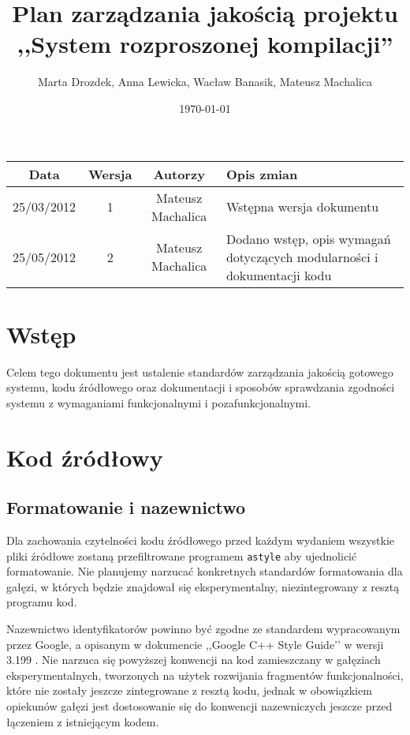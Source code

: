 \documentclass[a4paper]{article}
\title{Plan zarządzania jakością projektu ,,System rozproszonej kompilacji''}
\author{Marta Drozdek, Anna Lewicka, Wacław Banasik, Mateusz Machalica}
\date{\today}
\begin{document}
\maketitle

\begin{table}[!h]
	\centering
	\begin{tabular}{|c|c|c|p{9cm}|}
		\hline
		\textbf{Data} & \textbf{Wersja} & \textbf{Autorzy} & \textbf{Opis zmian} \\ \hline
		25/03/2012 & 1 & Mateusz Machalica & Wstępna wersja dokumentu \\ \hline
		25/05/2012 & 2 & Mateusz Machalica & Dodano wstęp, opis wymagań dotyczących modularności i dokumentacji kodu \\ \hline
	\end{tabular}
\end{table}

\section{Wstęp}

Celem tego dokumentu jest ustalenie standardów zarządzania jakością gotowego systemu, kodu źródłowego oraz dokumentacji i sposobów sprawdzania zgodności systemu z wymaganiami funkcjonalnymi i pozafunkcjonalnymi.

\section{Kod źródłowy}

\subsection{Formatowanie i nazewnictwo}

Dla zachowania czytelności kodu źródłowego przed każdym wydaniem wszystkie pliki źródłowe zostaną przefiltrowane programem \verb+astyle+ aby ujednolicić formatowanie. Nie planujemy narzucać konkretnych standardów formatowania dla gałęzi, w których będzie znajdował się eksperymentalny, niezintegrowany z resztą programu kod.

Nazewnictwo identyfikatorów powinno być zgodne ze standardem wypracowanym przez Google, a opisanym w dokumencie ,,Google C++ Style Guide’’ w wersji 3.199 \cite{googstyle}.
Nie narzuca się powyższej konwencji na kod zamieszczany w gałęziach eksperymentalnych, tworzonych na użytek rozwijania fragmentów funkcjonalności, które nie zostały jeszcze zintegrowane z resztą kodu, jednak w obowiązkiem opiekunów gałęzi jest dostosowanie się do konwencji nazewniczych jeszcze przed łączeniem z istniejącym kodem.
\end{document}
